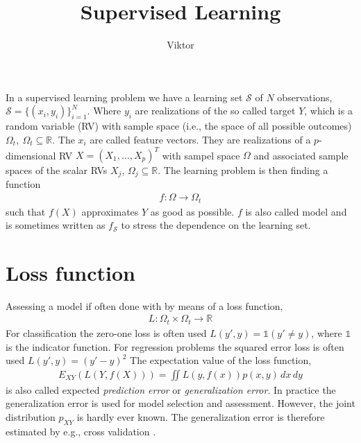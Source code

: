 \documentclass[12pt,a4paper]{article}
\begin{document}
\title{Supervised Learning}
\author{Viktor}
\maketitle

In a supervised learning problem we have a learning set $\mathcal S$ of 
$N$ observations, $\mathcal S = \{(x_i, y_i)\}_{i=1}^N$. Where $y_i$ are realizations of the so called target $Y$, which is a random variable (RV) with sample space (i.e., the space of all possible outcomes) $\Omega_t,  ~ \Omega_t \subseteq \mathbb R$. The $x_i$ are called feature vectors. They are realizations of a $p$-dimensional RV  $X=(X_1, \dots, X_p)^T$ with sampel space $\Omega$ and associated sample spaces of the scalar RVs $X_j$,   $\Omega_j \subseteq \mathbb R$. The learning problem is then finding a function
\begin{align}
	f: \Omega \rightarrow \Omega_t
\end{align}
such that $f(X)$ approximates $Y$ as good as possible. $f$ is also called model and is sometimes written as $f_\mathcal S$ to stress the dependence on the learning set.

\section{Loss function}
Assessing a model if often done with by means of a loss function, 
\begin{align}
	L : \Omega_t \times \Omega_t \rightarrow \mathbb R
\end{align}
For classification the zero-one loss is often used $L(y', y) = \mathbb 1 (y' \neq y)$, where $\mathbb 1$ is the indicator function. For regression problems the squared error loss is often used $L(y', y) = (y' - y)^2 $
The expectation value of the loss function,
\begin{align} \label{eq:expected_loss}
	E_{XY} \left( L(Y, f(X)) \right) = \iint L(y, f(x)) p(x,y)\,dx\, dy
\end{align}
is also called expected \textit{prediction error} or \textit{generalization error}. 
In practice the generalization error is used for model selection and assessment. However,  the joint distribution $p_{XY}$ is hardly ever known. The generalization error is therefore estimated by e.g.,  cross validation \cite{hasties}.
\end{document}
